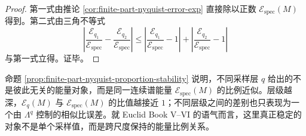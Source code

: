 \begin{proof}
第一式由推论 \ref{cor:finite-part-nyquist-error-exp} 直接除以正数 \(\mathcal E_{\mathrm{spec}}(M)\) 得到。第二式由三角不等式
\[
\left|
\frac{\mathcal E_{q_1}}{\mathcal E_{\mathrm{spec}}}
-
\frac{\mathcal E_{q_2}}{\mathcal E_{\mathrm{spec}}}
\right|
\le
\left|
\frac{\mathcal E_{q_1}}{\mathcal E_{\mathrm{spec}}}-1
\right|
+\left|
\frac{\mathcal E_{q_2}}{\mathcal E_{\mathrm{spec}}}-1
\right|
\]
与第一式立得。证毕。
\end{proof}

\begin{remark}\label{rem:finite-part-nyquist-bookVVI-reading}
命题 \ref{prop:finite-part-nyquist-proportion-stability} 说明，不同采样层 \(q\) 给出的不是彼此无关的能量对象，而是同一连续谱能量 \(\mathcal E_{\mathrm{spec}}(M)\) 的比例近似。层级越深，\(\mathcal E_q(M)\) 与 \(\mathcal E_{\mathrm{spec}}(M)\) 的比值越接近 \(1\)；不同层级之间的差别也只表现为一个由 \(\Lambda^q\) 控制的相似比误差。就 Euclid Book V--VI 的语气而言，这里真正稳定的对象不是单个采样值，而是跨尺度保持的能量比例关系。
\end{remark}
